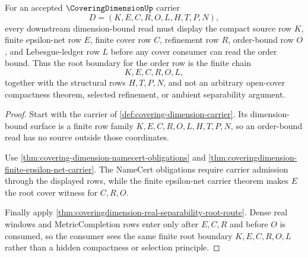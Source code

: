 \begin{theorem}
\label{thm:coveringdimension-finite-cover-root-boundary}
For an accepted $\CoveringDimensionUp$ carrier
$$
D=(K,E,C,R,O,L,H,T,P,N),
$$
every downstream dimension-bound read must display the compact source row $K$, finite epsilon-net row $E$, finite cover row $C$, refinement row $R$, order-bound row $O$, and Lebesgue-ledger row $L$ before any cover consumer can read the order bound. Thus the root boundary for the order row is the finite chain
$$
K,E,C,R,O,L,
$$
together with the structural rows $H,T,P,N$, and not an arbitrary open-cover compactness theorem, selected refinement, or ambient separability argument.
\end{theorem}
\begin{proof}
Start with the carrier of \autoref{def:covering-dimension-carrier}. Its dimension-bound surface is a finite row family $K,E,C,R,O,L,H,T,P,N$, so an order-bound read has no source outside those coordinates.

Use \autoref{thm:covering-dimension-namecert-obligations} and \autoref{thm:coveringdimension-finite-epsilon-net-carrier}. The NameCert obligations require carrier admission through the displayed rows, while the finite epsilon-net carrier theorem makes $E$ the root cover witness for $C,R,O$.

Finally apply \autoref{thm:coveringdimension-real-separability-root-route}. Dense real windows and MetricCompletion rows enter only after $E,C,R$ and before $O$ is consumed, so the consumer sees the same finite root boundary $K,E,C,R,O,L$ rather than a hidden compactness or selection principle.
\end{proof}

